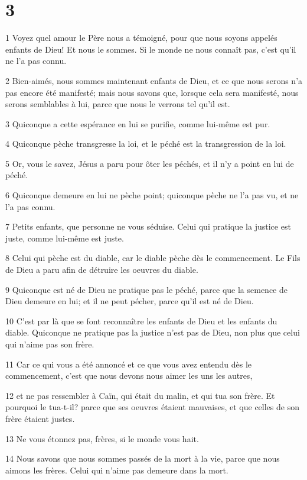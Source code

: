 \chapter{3}

\par 1 Voyez quel amour le Père nous a témoigné, pour que nous soyons appelés enfants de Dieu! Et nous le sommes. Si le monde ne nous connaît pas, c'est qu'il ne l'a pas connu.
\par 2 Bien-aimés, nous sommes maintenant enfants de Dieu, et ce que nous serons n'a pas encore été manifesté; mais nous savons que, lorsque cela sera manifesté, nous serons semblables à lui, parce que nous le verrons tel qu'il est.
\par 3 Quiconque a cette espérance en lui se purifie, comme lui-même est pur.
\par 4 Quiconque pèche transgresse la loi, et le péché est la transgression de la loi.
\par 5 Or, vous le savez, Jésus a paru pour ôter les péchés, et il n'y a point en lui de péché.
\par 6 Quiconque demeure en lui ne pèche point; quiconque pèche ne l'a pas vu, et ne l'a pas connu.
\par 7 Petits enfants, que personne ne vous séduise. Celui qui pratique la justice est juste, comme lui-même est juste.
\par 8 Celui qui pèche est du diable, car le diable pèche dès le commencement. Le Fils de Dieu a paru afin de détruire les oeuvres du diable.
\par 9 Quiconque est né de Dieu ne pratique pas le péché, parce que la semence de Dieu demeure en lui; et il ne peut pécher, parce qu'il est né de Dieu.
\par 10 C'est par là que se font reconnaître les enfants de Dieu et les enfants du diable. Quiconque ne pratique pas la justice n'est pas de Dieu, non plus que celui qui n'aime pas son frère.
\par 11 Car ce qui vous a été annoncé et ce que vous avez entendu dès le commencement, c'est que nous devons nous aimer les uns les autres,
\par 12 et ne pas ressembler à Caïn, qui était du malin, et qui tua son frère. Et pourquoi le tua-t-il? parce que ses oeuvres étaient mauvaises, et que celles de son frère étaient justes.
\par 13 Ne vous étonnez pas, frères, si le monde vous hait.
\par 14 Nous savons que nous sommes passés de la mort à la vie, parce que nous aimons les frères. Celui qui n'aime pas demeure dans la mort.
